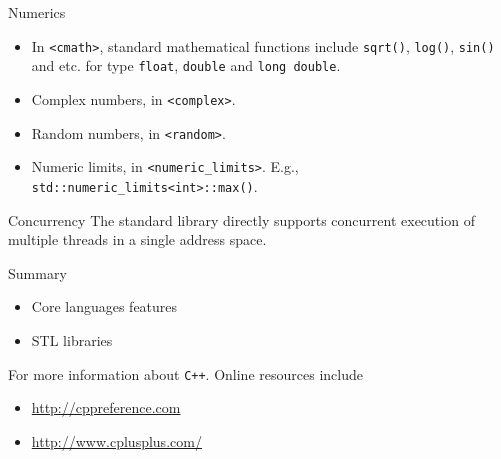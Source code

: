 \documentclass[presentation]{beamer}
\begin{document}
\begin{frame}[fragile,label={sec:orgheadline77}]{Numerics}
 \begin{itemize}
\item In \texttt{<cmath>}, standard mathematical functions include \texttt{sqrt()},
\texttt{log()}, \texttt{sin()} and etc. for type \texttt{float}, \texttt{double} and \texttt{long
     double}.
\item Complex numbers, in \texttt{<complex>}.
\item Random numbers, in \texttt{<random>}.
\item Numeric limits, in \texttt{<numeric\_limits>}.  E.g.,
\texttt{std::numeric\_limits<int>::max()}.
\end{itemize}
\end{frame}

\begin{frame}[label={sec:orgheadline78}]{Concurrency}
The standard library directly supports concurrent execution of
multiple threads in a single address space.
\end{frame}

\begin{frame}[fragile,label={sec:orgheadline79}]{Summary}
 \begin{itemize}
\item Core languages features
\item STL libraries
\end{itemize}


For more information about \texttt{C++}.  Online resources include
\begin{itemize}
\item \url{http://cppreference.com}
\item \url{http://www.cplusplus.com/}
\end{itemize}
\end{frame}
\end{document}
